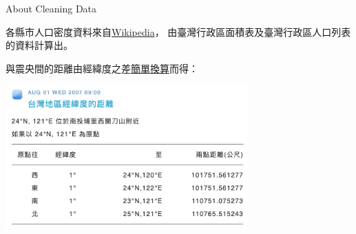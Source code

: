 \begin{frame}[fragile]{About Cleaning Data}

各縣市人口密度資料來自{\color{blue}\href{https://zh.wikipedia.org/wiki/臺灣行政區人口密度表}{Wikipedia}}，
由臺灣行政區面積表及臺灣行政區人口列表的資料計算出。

與震央間的距離由經緯度之差{\color{blue}\href{https://wywu.pixnet.net/blog/post/22338038}{簡單換算}}而得：

	\includegraphics[width=0.7\textwidth]{Images/distance.png}

\end{frame}

